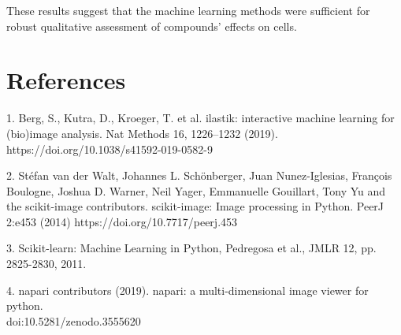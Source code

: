 \documentclass[12pt]{article}
\begin{document}
These results suggest that the machine learning methods were sufficient for robust qualitative assessment of 
compounds' effects on cells. 

\newpage
\section{References}

1. Berg, S., Kutra, D., Kroeger, T. et al. ilastik: interactive machine learning for (bio)image
analysis. Nat Methods 16, 1226–1232 (2019). https://doi.org/10.1038/s41592-019-0582-9 

2. Stéfan van
der Walt, Johannes L. Schönberger, Juan Nunez-Iglesias, François Boulogne, Joshua D. Warner, Neil
Yager, Emmanuelle Gouillart, Tony Yu and the scikit-image contributors. scikit-image: Image
processing in Python. PeerJ 2:e453 (2014) https://doi.org/10.7717/peerj.453 

3. Scikit-learn: Machine Learning in Python, Pedregosa et al., JMLR 12, pp. 2825-2830, 2011.

4. napari contributors (2019). napari: a multi-dimensional image viewer for python. \\
doi:10.5281/zenodo.3555620
\end{document}
